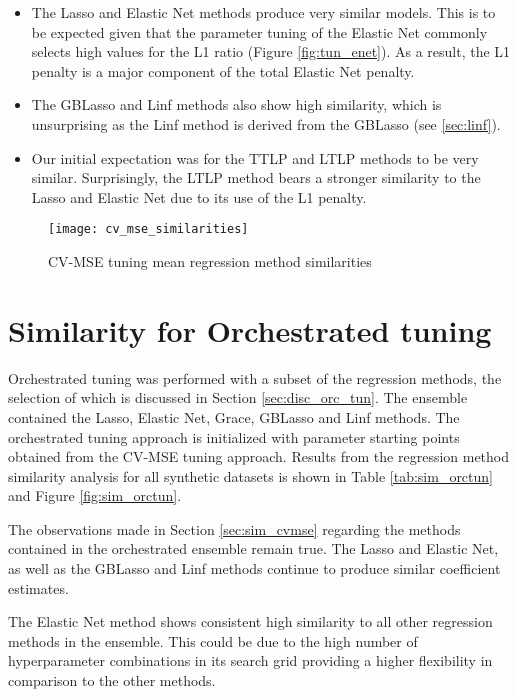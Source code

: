 \begin{itemize}
	\item The Lasso and Elastic Net methods produce very similar models. This is to be expected given that the parameter tuning of the Elastic Net commonly selects high values for the L1 ratio (Figure \ref{fig:tun_enet}). As a result, the L1 penalty is a major component of the total Elastic Net penalty.
	\item The GBLasso and Linf methods also show high similarity, which is unsurprising as the Linf method is derived from the GBLasso (see  \ref{sec:linf}).
	\item Our initial expectation was for the TTLP and LTLP methods to be very similar. Surprisingly, the LTLP method bears a stronger similarity to the Lasso and Elastic Net due to its use of the L1 penalty.
\end{itemize}



\begin{figure}[H]
	\centering
	\texttt{[image: cv\_mse\_similarities]}
	\caption{CV-MSE tuning mean regression method similarities}
	\label{fig:sim_cvmse}
\end{figure}


\section{Similarity for Orchestrated tuning} \label{sec:sim_orctun}
Orchestrated tuning was performed with a subset of the regression methods, the selection of which is discussed in Section \ref{sec:disc_orc_tun}. The ensemble contained the Lasso, Elastic Net, Grace, GBLasso and Linf methods. The orchestrated tuning approach is initialized with parameter starting points obtained from the CV-MSE tuning approach. Results from the regression method similarity analysis for all synthetic datasets is shown in Table \ref{tab:sim_orctun} and Figure \ref{fig:sim_orctun}. 

The observations made in Section \ref{sec:sim_cvmse} regarding the methods contained in the orchestrated ensemble remain true. The Lasso and Elastic Net, as well as the GBLasso and Linf methods continue to produce similar coefficient estimates. 

The Elastic Net method shows consistent high similarity to all other regression methods in the ensemble. This could be due to the high number of hyperparameter combinations in its search grid providing a higher flexibility in comparison to the other methods.

